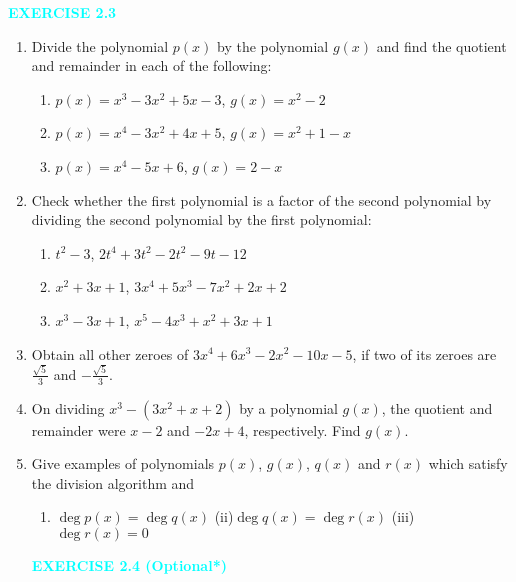 \documentclass[12pt]{article}
\begin{document}
\begin{center}
\noindent\textcolor{cyan}{\textbf{EXERCISE 2.3}}
\end{center}

\begin{enumerate}
\item Divide the polynomial $p(x)$ by the polynomial $g(x)$ and find the quotient and remainder in each of the following:

\begin{enumerate}
    \item $p(x) = x^3 - 3x^2 + 5x - 3$, \quad $g(x) = x^2 - 2$
    \item $p(x) = x^4 - 3x^2 + 4x + 5$, \quad $g(x) = x^2 + 1 - x$
    \item $p(x) = x^4 - 5x + 6$,        \quad $g(x) = 2 - x$
\end{enumerate}

\item Check whether the first polynomial is a factor of the second polynomial by dividing the second polynomial by the first polynomial:
\begin{enumerate}
    \item $t^2 - 3$, \quad $2t^4 + 3t^2 - 2t^2 - 9t - 12$
    \item $x^2 + 3x + 1$, \quad $3x^4 + 5x^3 - 7x^2 + 2x + 2$
    \item $x^3 - 3x + 1$, \quad $x^5 - 4x^3 + x^2 + 3x + 1$
\end{enumerate}

\item Obtain all other zeroes of $3x^4 + 6x^3 - 2x^2 - 10x - 5$, if two of its zeroes are $\frac{\sqrt{5}}{3}$ and $-\frac{\sqrt{5}}{3}$.

\item On dividing $x^3 - \left(3x^2 + x + 2\right)$ by a polynomial $g(x)$, the quotient and remainder were $x - 2$     and $-2x + 4$, respectively. Find $g(x)$.

\item Give examples of polynomials $p(x)$, $g(x)$, $q(x)$ and $r(x)$ which satisfy the division algorithm and
\begin{enumerate}
    \item $\deg p(x) = \deg q(x)$ \hspace{1em}  (ii)$\deg q(x) = \deg r(x)$  \hspace{1em}(iii) $\deg r(x) = 0$
\end{enumerate}


\begin{center}
\noindent\textcolor{cyan}{\textbf{EXERCISE 2.4 (Optional*)}}
\end{center}



\end{enumerate}
\end{document}
